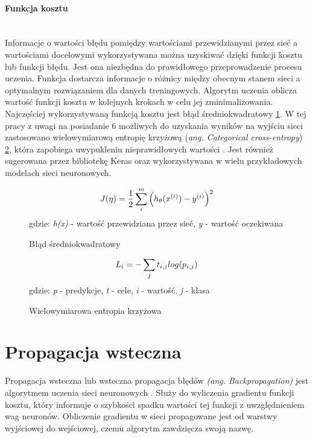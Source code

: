 \paragraph{Funkcja kosztu} \mbox{}\\
Informacje o wartości błędu pomiędzy wartościami przewidzianymi przez sieć
a wartościami docelowymi wykorzystywana można uzyskiwać dzięki funkcji kosztu lub funkcji błędu.
Jest ona niezbędna do prawidłowego przeprowadzenie procesu uczenia.
Funkcja dostarcza informacje o różnicy między obecnym stanem sieci a optymalnym
rozwiązaniem dla danych treningowych. Algorytm uczenia
oblicza wartość funkcji kosztu w kolejnych krokach w celu jej zminimalizowania.\\
Najczęściej wykorzystywaną funkcją kosztu jest błąd średniokwadratowy \ref{eq:mse}.
W tej pracy z uwagi na posiadanie 6 możliwych do uzyskania wyników na wyjściu sieci
zastosowano wielowymiarową entropię krzyżową (\textit{ang. Categorical cross-entropy}) \ref{eq:categorical-crossentropy},
która zapobiega uwypukleniu nieprawidłowych wartości \cite{whyNotMSE}. Jest również
sugerowana przez bibliotekę Keras oraz wykorzystywana w wielu przykładowych modelach sieci neuronowych.
\begin{figure}[h!]
\renewcommand{\figurename}{Wzór}%
\begin{equation*}
J(\eta) = \frac {1}{2} \sum_{i}^{m} \Big(h_{\theta}(x^{(i)}) - y^{(i)} \Big)^2\\
\end{equation*}
\centering
gdzie: \textit{h\textsubscript{\straighttheta}(x)} - wartość przewidziana przez sieć, \textit{y} - wartość oczekiwana
\caption{Błąd średniokwadratowy}
\label{eq:mse}
\end{figure}
\begin{figure}[h!]
\renewcommand{\figurename}{Wzór}%
\begin{equation*}
L_{i} = - \sum_{j} t_{i,j} log(p_{i,j})\\
\end{equation*}
\centering
gdzie: \textit{p} - predykcje, \textit{t} - cele, \textit{i} - wartość, \textit{j} - klasa
\caption{Wielowymiarowa entropia krzyżowa}
\label{eq:categorical-crossentropy}
\end{figure}

\section{Propagacja wsteczna}
Propagacja wsteczna lub wsteczna propagacja błędów \textit{(ang. Backpropagation)}
jest algorytmem uczenia sieci neuronowych \cite{CS231n_backprop, backprop}.
Służy do wyliczenia gradientu funkcji kosztu, który informuje o szybkości spadku wartości tej funkcji
z uwzględnieniem wag neuronów. Obliczenie gradientu w sieci propagowane
jest od warstwy wyjściowej do wejściowej, czemu algorytm zawdzięcza swoją nazwę.

